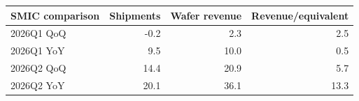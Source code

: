 \begin{tabular}{lrrr}\toprule
SMIC comparison & Shipments & Wafer revenue & Revenue/equivalent \\\midrule
2026Q1 QoQ & -0.2 & 2.3 & 2.5 \\
2026Q1 YoY & 9.5 & 10.0 & 0.5 \\
2026Q2 QoQ & 14.4 & 20.9 & 5.7 \\
2026Q2 YoY & 20.1 & 36.1 & 13.3 \\
\bottomrule\end{tabular}
